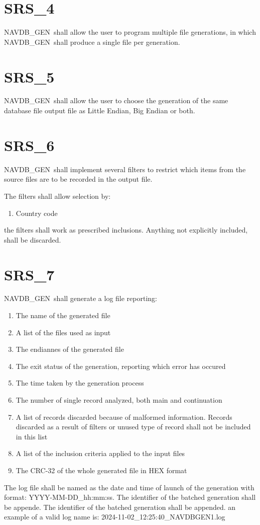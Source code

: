 \documentclass{scrreprt}
\def\NAVDBGEN{NAVDB\_GEN}
\begin{document}
\section{SRS\_4}
\label{SRS:4}
\NAVDBGEN\ shall allow the user to program multiple file generations, in which \NAVDBGEN\ shall produce a single file per generation.
\section{SRS\_5}
\label{SRS:5}
\NAVDBGEN\ shall allow the user to choose the generation of the same database file output file as Little Endian, Big Endian or both.
\section{SRS\_6}
\label{SRS:6}
\NAVDBGEN\ shall implement several filters to restrict which items from the source files are to be recorded in the output file.

The filters shall allow selection by:
\begin{enumerate} 
  \item Country code
\end{enumerate}
the filters shall work as prescribed inclusions. Anything not explicitly included, shall be discarded.
\section{SRS\_7}
\label{SRS:7}
\NAVDBGEN\ shall generate a log file reporting:
\begin{enumerate}
  \item The name of the generated file
  \item A list of the files used as input
  \item The endiannes of the generated file
  \item The exit status of the generation, reporting which error has occured
  \item The time taken by the generation process
  \item The number of single record analyzed, both main and continuation
  \item A list of records discarded because of malformed information. Records discarded as a result of filters or
unused type of record shall not be included in this list
  \item A list of the inclusion criteria applied to the input files
  \item The CRC-32 of the whole generated file in HEX format
\end{enumerate}
The log file shall be named as the date and time of launch of the generation with format: YYYY-MM-DD\_hh:mm:ss. The identifier of the batched generation shall be appende. The identifier of the batched generation shall be appended.
an example of a valid log name is: 2024-11-02\_12:25:40\_NAVDBGEN1.log
\end{document}
